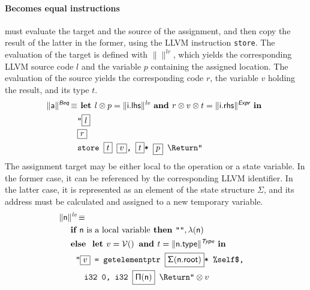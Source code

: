 \documentclass{llncs}
\newcommand{\trad}[2]{\ensuremath{\lVert \textsf{#1} \rVert^{\textit{#2}}}}
\newcommand{\nl}[0]{\text{\Return}}
\DeclareMathOperator{\conc}{\diamond}
\DeclareMathOperator{\isdef}{\equiv}
\DeclareMathOperator{\variable}{\mathcal{V}()}
\newcommand{\llvm}[1]{\texttt{#1}}
\newcommand{\B}[1]{\textsf{#1}}
\newcommand{\IF}[0]{\textbf{ if }}
\newcommand{\ELSE}[0]{\textbf{ else }}
\newcommand{\THEN}[0]{\textbf{ then }}
\newcommand{\LET}[0]{\textbf{ let }}
\newcommand{\IN}[0]{\textbf{ in }}
\newcommand{\AND}[0]{\textbf{ and }}
\newcommand{\PH}[1]{\framebox{$#1$}}
\newcommand{\sep}[0]{\otimes}
\newcommand{\local}[0]{\ensuremath{\sf\lambda}}
\newcommand{\idx}[0]{\ensuremath{\sf\Pi}}
\newcommand{\state}[0]{\ensuremath{\sf\Sigma}}
\begin{document}
\paragraph{Becomes equal instructions} must evaluate the target and the source
of the assignment, and then copy the result of the latter in the former, using
the LLVM instruction \llvm{store}. The evaluation of the target is defined with
$\trad{}{lv}$, which yields the corresponding LLVM source code $l$ and the
variable $p$ containing the assigned location. The evaluation of the source
yields the corresponding code $r$, the variable $v$ holding the result, and its
type $t$.
\begin{align*}
\begin{split}
  \trad{a}{\B{Beq}} \isdef 
  & \LET l \sep p = \trad{i.lhs}{lv} \AND r \sep v \sep t = \trad{i.rhs}{\B{Expr}} \IN \\
  & \llvm{"\PH{l}} \\
  & \llvm{\PH{r}} \\
  & \llvm{store \PH{t} \PH{v}, \PH{t}* \PH{p} \nl"}
\end{split}
\end{align*}
The assignment target may be either local to the operation or a state
variable. In the former case, it can be referenced by the corresponding LLVM
identifier. In the latter case, it is represented as an element of the state
structure $\Sigma$, and its address must be calculated and assigned to a new temporary
variable.
\begin{align*}
\lefteqn{\trad{n}{lv} \isdef} \\
& \quad \IF \mbox{\B{n} is a local variable} \THEN \llvm{""}, \local(\B{n}) \\
& \quad \ELSE \LET v = \variable \AND t = \trad{n.type}{\B{Type}} \IN \\
& \quad \quad \llvm{"\PH{v} = getelementptr \PH{\state(\B{n.root})}* \%self\$,} \\
& \quad \quad \quad \llvm{i32 0, i32 \PH{\idx(\B{n})} \nl"} \sep v
\end{align*}
\end{document}
